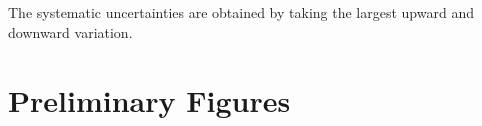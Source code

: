     
%
%
%


The systematic uncertainties are obtained by taking the largest upward and downward variation.

%
%


\section{Preliminary Figures}


